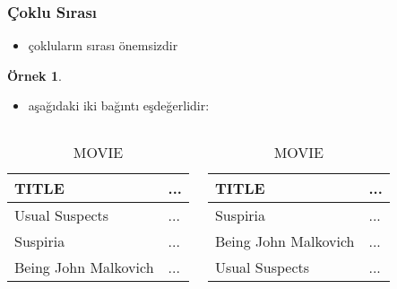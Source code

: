 \documentclass[dvipsnames]{beamer}
\theoremstyle{definition}
\theoremstyle{example}
\newtheorem{ornek}[theorem]{Örnek}
\theoremstyle{plain}
\begin{document}
\begin{frame}
  \frametitle{Çoklu Sırası}

  \begin{itemize}
    \item çokluların sırası önemsizdir
  \end{itemize}

  \pause
  \begin{ornek}
    \begin{itemize}
      \item aşağıdaki iki bağıntı eşdeğerlidir:
    \end{itemize}

    \begin{columns}
      \begin{tiny}
      \begin{table}
        \caption{MOVIE}
        \begin{tabular}{|l|l|}\hline
TITLE                & ...\\\hline\hline
Usual Suspects       & ...\\\hline
Suspiria             & ...\\\hline
Being John Malkovich & ...\\\hline
        \end{tabular}
      \end{table}
      \end{tiny}

      \begin{tiny}
      \begin{table}
        \caption{MOVIE}
        \begin{tabular}{|l|l|}\hline
TITLE                & ...\\\hline\hline
Suspiria             & ...\\\hline
Being John Malkovich & ...\\\hline
Usual Suspects       & ...\\\hline
        \end{tabular}
      \end{table}
      \end{tiny}
    \end{columns}
  \end{ornek}
\end{frame}
\end{document}
